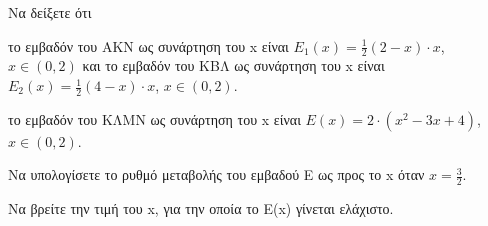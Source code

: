 \begin{alist}
\item Να δείξετε ότι
    \begin{rlist}
        \item το εμβαδόν του ΑΚΝ ως συνάρτηση του x είναι $E_1(x) = \frac{1}{2}(2-x) \cdot x$, $x \in (0,2)$ και το εμβαδόν του ΚΒΛ ως συνάρτηση του x είναι $E_2(x) = \frac{1}{2}(4-x) \cdot x$, $x \in (0,2)$.
        \item το εμβαδόν του ΚΛΜΝ ως συνάρτηση του x είναι $E(x)=2 \cdot (x^2 - 3x + 4)$, $x \in (0,2)$.
    \end{rlist}

\item Να υπολογίσετε το ρυθμό μεταβολής του εμβαδού Ε ως προς το x όταν $x = \frac{3}{2}$.

\item Να βρείτε την τιμή του x, για την οποία το E(x) γίνεται ελάχιστο.

\end{alist}

